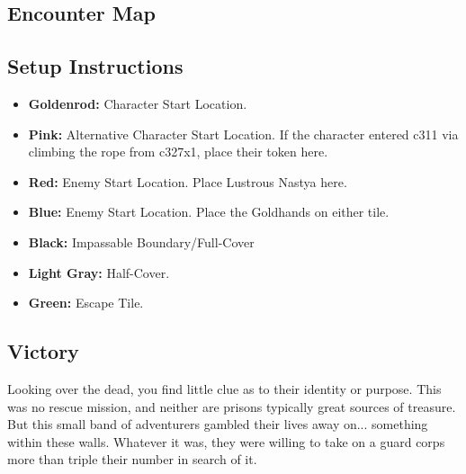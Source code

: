 \pagebreak

\subsection*{Encounter Map}
\begin{center}
\end{center}

\subsection*{Setup Instructions}
\begin{itemize}
\item \textbf{Goldenrod:} Character Start Location.
\item \textbf{Pink:} Alternative Character Start Location. If the character entered c311 via climbing the rope from c327x1, place their token here.
\item \textbf{Red:} Enemy Start Location. Place Lustrous Nastya here.
\item \textbf{Blue:} Enemy Start Location. Place the Goldhands on either tile.
\item \textbf{Black:} Impassable Boundary/Full-Cover
\item \textbf{Light Gray:} Half-Cover.
\item \textbf{Green:} Escape Tile.
\end{itemize}

\pagebreak

\subsection*{Victory}
Looking over the dead, you find little clue as to their identity or purpose. This was no rescue mission, and neither are prisons typically great sources of treasure. But this small band of adventurers gambled their lives away on... something within these walls. Whatever it was, they were willing to take on a guard corps more than triple their number in search of it.\\

